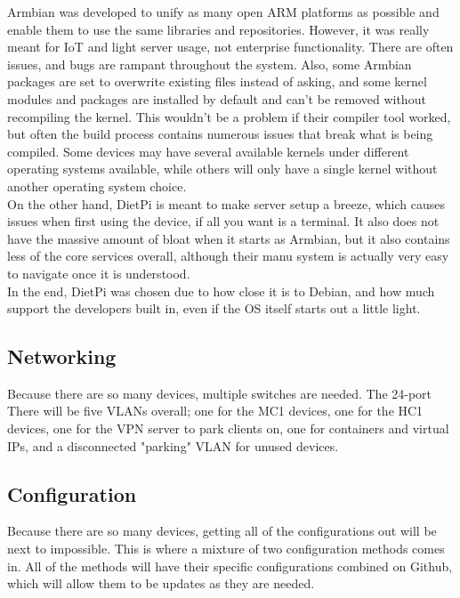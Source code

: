 \documentclass[12pt]{spieman}  %
\begin{document}
Armbian was developed to unify as many open ARM platforms as possible and enable them to use the same libraries and repositories. However, it was really meant for IoT and light server usage, not enterprise functionality. There are often issues, and bugs are rampant throughout the system. Also, some Armbian packages are set to overwrite existing files instead of asking, and some kernel modules and packages are installed by default and can’t be removed without recompiling the kernel. This wouldn't be a problem if their compiler tool worked, but often the build process contains numerous issues that break what is being compiled. Some devices may have several available kernels under different operating systems available, while others will only have a single kernel without another operating system choice.\\

On the other hand, DietPi is meant to make server setup a breeze, which causes issues when first using the device, if all you want is a terminal. It also does not have the massive amount of bloat when it starts as Armbian, but it also contains less of the core services overall, although their manu system is actually very easy to navigate once it is understood.\\

In the end, DietPi was chosen due to how close it is to Debian, and how much support the developers built in, even if the OS itself starts out a little light.

\subsection{Networking}
\label{subsec:arm-network}

Because there are so many devices, multiple switches are needed. The 24-port \\

There will be five VLANs overall; one for the MC1 devices, one for the HC1 devices, one for the VPN server to park clients on, one for containers and virtual IPs, and a disconnected "parking" VLAN for unused devices.

\subsection{Configuration}
\label{subsec:arm-config}

Because there are so many devices, getting all of the configurations out will be next to impossible. This is where a mixture of two configuration methods comes in. All of the methods will have their specific configurations combined on Github, which will allow them to be updates as they are needed.
\end{document}
